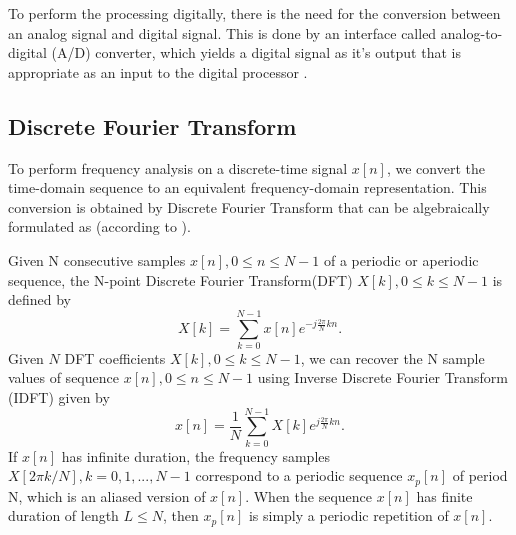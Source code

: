 \documentclass[twoside]{ctuthesis}
\theoremstyle{plain}
\theoremstyle{definition}
\theoremstyle{note}
\begin{document}
To perform the processing digitally, there is the need for the conversion between an analog signal and digital signal. This is done by an interface called analog-to-digital (A/D) converter, which yields a digital signal as it's output that is appropriate as an input to the digital processor \cite{cite:2,cite:3}.

\subsection{Discrete Fourier Transform}
\label{sec:DiscreteFourierTransform}
To perform frequency analysis on a discrete-time signal ${x[n]}$, we convert the time-domain sequence to an equivalent frequency-domain representation. This conversion is obtained by Discrete Fourier Transform that can be algebraically formulated as (according to \cite{cite:2,cite:3}).

Given N consecutive samples $x[n], 0 \leq n \leq N-1$ of a periodic or aperiodic sequence, the N-point Discrete Fourier Transform(DFT) $X[k], 0 \leq k \leq N-1$ is defined by
\begin{equation} \label{eq:DFT}
	X[k]=\sum_{k=0}^{N-1}x[n]e^{-j \frac{2 \pi}{N} kn}.
\end{equation}
Given $N$ DFT coefficients $X[k], 0 \leq k \leq N-1$, we can recover the N sample values of sequence $x[n], 0 \leq n \leq N-1$ using Inverse Discrete Fourier Transform (IDFT) given by
\begin{equation} \label{eq:IDFT}
	x[n]=\frac{1}{N} \sum_{k=0}^{N-1}X[k]e^{j \frac{2 \pi}{N} kn}.
\end{equation}
If $x[n]$ has infinite duration, the frequency samples  $X[2 \pi k/ N], k=0, 1, ..., N-1$ correspond to a periodic sequence $x_{p}[n]$ of period N, which is an aliased version of $x[n]$. When the sequence $x[n]$ has finite duration of length $L \leq N$, then  $x_{p}[n]$ is simply a periodic repetition of $x[n]$.
\end{document}

